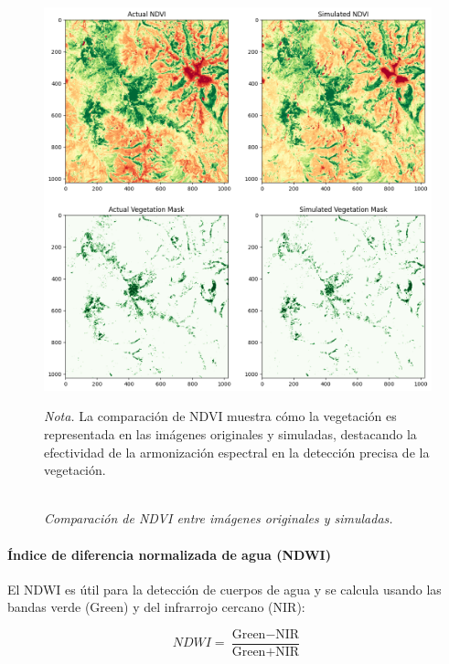                     \begin{figure}[H] 
                        \caption{\doublespacing \\ \textit{Comparación de NDVI entre imágenes originales y simuladas.}} 
                        \centering
                        \includegraphics[width=1\linewidth]{2_CAPITULO5/IMG/ndvi2.png}
                        \begin{justify}
                            \textit{Nota.} La comparación de NDVI muestra cómo la vegetación es representada en las imágenes originales y simuladas, destacando la efectividad de la armonización espectral en la detección precisa de la vegetación.
                        \end{justify}                    
                        \label{ndvi2}
                    \end{figure}
        

                \paragraph{Índice de diferencia normalizada de agua (NDWI)}
                    El NDWI es útil para la detección de cuerpos de agua y se calcula usando las bandas verde (Green) y del infrarrojo cercano (NIR):

                    \begin{equation}
                        NDWI = \frac{\text{Green} - \text{NIR}}{\text{Green} + \text{NIR}}
                    \end{equation}

